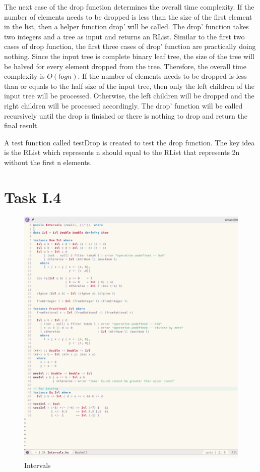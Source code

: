 \documentclass{article}
\begin{document}
\begin{normalsize}
  The next case of the drop function determines the overall time complexity. If the number of elements needs to be dropped is less than the size of the first element in the list, then a helper function drop' will be called. The drop' function takes two integers and a tree as input and returns an RList. Similar to the first two cases of drop function, the first three cases of drop' function are practically doing nothing. Since the input tree is complete binary leaf tree, the size of the tree will be halved for every element dropped from the tree. Therefore, the overall time complexity is $O
  (log{}n)$. If the number of elements needs to be dropped is less than or equals to the half size of the input tree, then only the left children of the input tree will be processed. Otherwise, the left children will be dropped and the right children will be processed accordingly. The drop' function will be called recursively until the drop is finished or there is nothing to drop and return the final result.

  A test function called testDrop is created to test the drop function. The key idea is the RList which represents n should equal to the RList that represents
  2n without the first n elements.

  \section{Task I.4}
  
  \begin{figure}[H]
    \centering
    \centerline{\includegraphics[scale=0.4]{Intervals}}
    \caption{Intervals}
    \label{fig:intervals}
  \end{figure}
  

\end{normalsize}
\end{document}
